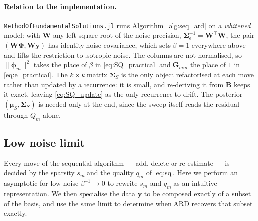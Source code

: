 \documentclass[a4paper]{article}
\renewcommand{\vec}[1]{\boldsymbol{#1}}
\begin{document}
\paragraph{Relation to the implementation.} \texttt{MethodOfFundamentalSolutions.jl} runs Algorithm~\ref{alg:seq_ard} on a \emph{whitened} model: with $\mathbf W$ any left square root of the noise precision, $\mathbf \Sigma_\epsilon^{-1} = \mathbf W^\top \mathbf W$, the pair $(\mathbf W \mathbf \Phi, \mathbf W \mathbf y)$ has identity noise covariance, which sets $\beta = 1$ everywhere above and lifts the restriction to isotropic noise. The columns are not normalised, so $\|\vec \phi_m\|^2$ takes the place of $\beta$ in \eqref{eq:SQ_practical} and $\mathbf G_{mm}$ the place of $1$ in \eqref{eq:e_practical}. The $k \times k$ matrix $\mathbf \Sigma_S$ is the only object refactorised at each move rather than updated by a recurrence: it is small, and re-deriving it from $\mathbf B$ keeps it exact, leaving \eqref{eq:SQ_update} as the only recurrence to drift. The posterior $(\vec \mu_S, \mathbf \Sigma_S)$ is needed only at the end, since the sweep itself reads the residual through $Q_m$ alone.


\subsection{Low noise limit} \label{sec:exact_basis}

Every move of the sequential algorithm --- add, delete or re-estimate --- is decided by the sparsity $s_m$ and the quality $q_m$ of \eqref{eq:sq}. Here we perform an asymptotic for low noise $\beta^{-1} \to 0$ to rewrite $s_m$ and $q_m$ as an intuitive representation. We then specialise the data $\mathbf y$ to be composed exactly of a subset of the basis, and use the same limit to determine when ARD recovers that subset exactly.

\end{document}

